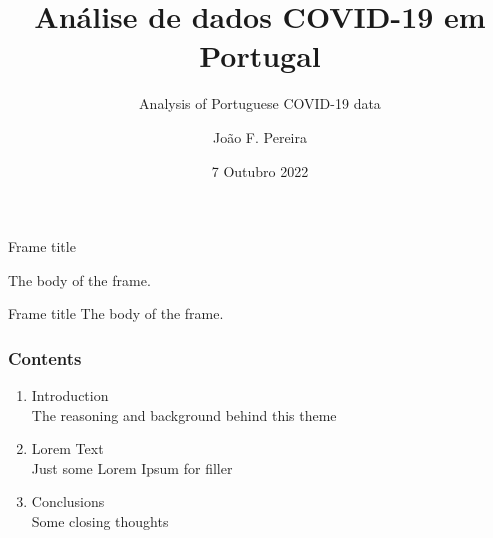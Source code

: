 \documentclass[pdf]
{beamer}
\title{Análise de dados COVID-19 em Portugal}
\subtitle{Analysis of Portuguese COVID-19 data}
\author{João F. Pereira}
\date{7 Outubro 2022}
\begin{document}
	
\begin{frame}
\titlepage
\end{frame}
\begin{frame}{Frame title}

The body of the frame.
\end{frame}
\begin{frame}{Frame title}
The body of the frame.
\end{frame}


	\begin{frame}
		\frametitle{Contents}
		\begin{enumerate}
			\item Introduction \\ \textcolor{ExecusharesGrey}{\footnotesize\hspace{1em} The reasoning and background behind this theme}
			\item Lorem Text  \\ \textcolor{ExecusharesGrey}{\footnotesize\hspace{1em} Just some Lorem Ipsum for filler}
			\item Conclusions \\ \textcolor{ExecusharesGrey}{\footnotesize\hspace{1em} Some closing thoughts}
		\end{enumerate}
	\end{frame}
	
\end{document}
